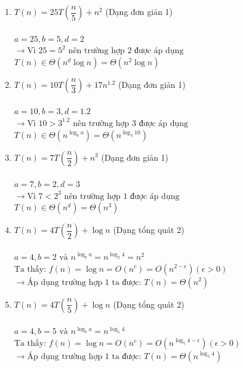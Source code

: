 \documentclass[12pt, letterpaper]{article}
\begin{document}
\begin{enumerate}[label=\bfseries\large\theenumi.]
    \item $ T(n) = 25T\left( \dfrac{n}{5} \right) + n^2 $ (Dạng đơn giản 1) \\ \\
        $ a = 25, b = 5, d = 2 $ \\
        $ \rightarrow \text{Vì } 25 = 5^2 \text{ nên trường hợp 2 được áp dụng} $ \\
        $ T(n) \in \Theta(n^d \log n) = \Theta(n^2 \log n) $

    \item $ T(n) = 10T\left( \dfrac{n}{3} \right) + 17n^{1.2} $ (Dạng đơn giản 1) \\ \\
        $ a = 10, b = 3, d = 1.2 $ \\
        $ \rightarrow \text{Vì } 10 > 3^{1.2} \text{ nên trường hợp 3 được áp dụng} $ \\
        $ T(n) \in \Theta(n^{\log_b a}) = \Theta(n^{\log_3 10}) $

    \item $ T(n) = 7T\left( \dfrac{n}{2} \right) + n^3 $ (Dạng đơn giản 1) \\ \\
        $ a = 7, b = 2, d = 3 $ \\
        $ \rightarrow \text{Vì } 7 < 2^3 \text{ nên trường hợp 1 được áp dụng} $ \\
        $ T(n) \in \Theta(n^d) = \Theta(n^3) $

    \item $ T(n) = 4T\left( \dfrac{n}{2} \right) + \log n $ (Dạng tổng quát 2) \\ \\
        $ a = 4, b = 2 \text{ và } n^{\log_b a} = n^{\log_2 4} = n^2 $ \\
        $ \text{Ta thấy: } f(n) = \log n = O(n^c) = O(n^{2 - \epsilon}) (\epsilon > 0) $ \\
        $ \rightarrow \text{Áp dụng trường hợp 1 ta được: } T(n) = \Theta(n^2) $

    \item $ T(n) = 4T\left( \dfrac{n}{5} \right) + \log n $ (Dạng tổng quát 2) \\ \\
        $ a = 4, b = 5 \text{ và } n^{\log_b a} = n^{\log_5 4} $ \\
        $ \text{Ta thấy: } f(n) = \log n = O(n^c) = O(n^{\log_5 4 - \epsilon}) (\epsilon > 0) $ \\
        $ \rightarrow \text{Áp dụng trường hợp 1 ta được: } T(n) = \Theta(n^{\log_5 4}) $


\end{enumerate}
\end{document}
